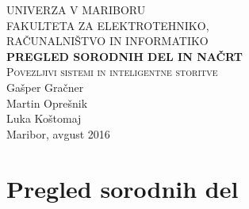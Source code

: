 \documentclass[a4paper,11pt]{article}
\begin{document}
\begin{titlepage}


\newcommand{\HRule}{\rule{\linewidth}{0.5mm}} %

\center %
 

\textsc{ UNIVERZA V MARIBORU\\ FAKULTETA ZA ELEKTROTEHNIKO,\\RAČUNALNIŠTVO IN INFORMATIKO}\\[5cm] %

{ \huge \bfseries \textbf{PREGLED SORODNIH DEL IN NAČRT}}\\[0.4cm] %
\textsc{\large Povezljivi sistemi in inteligentne storitve}\\[5cm] %

{\large Gašper Gračner}\\[0.4cm]
{\large Martin Oprešnik}\\[0.4cm]
{\large Luka Koštomaj}\\[0.4cm] 

\vfill %
{\large Maribor, avgust 2016}\\[3cm] %
\end{titlepage}
\newpage


\section{Pregled sorodnih del}
\end{document}
